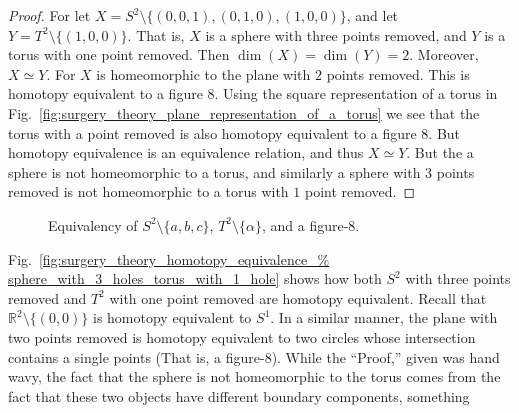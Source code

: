 \documentclass[crop=false,class=book,oneside]{standalone}
\begin{document}
            \begin{proof}
                For let $X=S^{2}\setminus\{(0,0,1),(0,1,0),(1,0,0)\}$,
                and let $Y=T^{2}\setminus\{(1,0,0)\}$.
                That is, $X$ is a sphere with three points removed,
                and $Y$ is a torus with one point removed. Then
                $\dim(X)=\dim(Y)=2$.
                Moreover, $X\simeq Y$. For $X$ is homeomorphic
                to the plane with $2$ points removed. This is
                homotopy equivalent to a figure $8$.
                Using the square representation of a torus in
                Fig.~\ref{fig:surgery_theory_plane_representation_of_a_torus}
                we see that the torus with a point removed
                is also homotopy equivalent to a figure $8$.
                But homotopy equivalence is an equivalence
                relation, and thus $X\simeq Y$. But the a sphere
                is not homeomorphic to a torus, and similarly a
                sphere with $3$ points removed is not homeomorphic
                to a torus with $1$ point removed.
            \end{proof}
            \begin{figure}[H]
                    \centering
                    \captionsetup{type=figure}
                    \caption{Equivalency of $S^{2}\setminus\{a,b,c\}$,
                             $T^{2}\setminus\{\alpha\}$, and a figure-8.}
                    \label{fig:surgery_theory_homotopy_equivalence_%
                           sphere_with_3_holes_torus_with_1_hole}
            \end{figure} 
            Fig.~\ref{fig:surgery_theory_homotopy_equivalence_%
                      sphere_with_3_holes_torus_with_1_hole}
            shows how both $S^{2}$ with three points
            removed and $T^{2}$ with one point removed are
            homotopy equivalent. Recall that
            $\mathbb{R}^{2}\setminus \{(0,0)\}$ is homotopy
            equivalent to $S^{1}$. In a similar manner,
            the plane with two points removed is homotopy
            equivalent to two circles whose intersection
            contains a single points (That is, a figure-$8$).
            While the ``Proof,'' given was hand wavy,
            the fact that the sphere is not homeomorphic to the
            torus comes from the fact that these two objects
            have different boundary components, something
\end{document}
